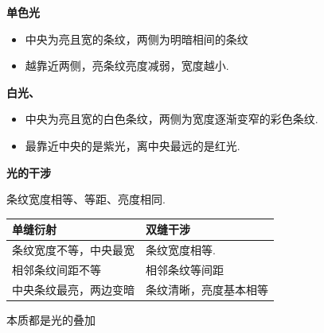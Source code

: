 
\textbf{单色光}
\begin{itemize}
\item 中央为亮且宽的条纹，两侧为明暗相间的条纹
\item 越靠近两侧，亮条纹亮度减弱，宽度越小.
\end{itemize}

\textbf{白光、}
\begin{itemize}
\item 中央为亮且宽的白色条纹，两侧为宽度逐渐变窄的彩色条纹.
\item 最靠近中央的是紫光，离中央最远的是红光.
\end{itemize}
\textbf{光的干涉}


条纹宽度相等、等距、亮度相同.
\begin{center}
\begin{tabular}{ll}
\toprule
单缝衍射 & 双缝干涉 \\
\midrule
条纹宽度不等，中央最宽 & 条纹宽度相等. \\
相邻条纹间距不等 & 相邻条纹等间距 \\
中央条纹最亮，两边变暗 & 条纹清晰，亮度基本相等 \\
\bottomrule
\end{tabular}
\end{center}

本质都是光的叠加 %
